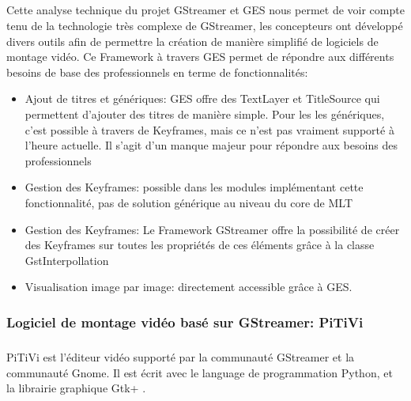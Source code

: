 \subparagraph{ }

Cette analyse technique du projet GStreamer et GES nous permet de voir
compte tenu de la technologie très complexe de GStreamer, les concepteurs
ont développé divers outils afin de permettre la création de manière
simplifié de logiciels de montage vidéo. Ce Framework à travers GES
permet de répondre aux différents besoins de base des professionnels
en terme de fonctionnalités:

\begin{itemize}

  \item {Ajout de titres et génériques: GES offre des TextLayer
  et TitleSource qui permettent d'ajouter des titres de manière
  simple. Pour les
    les génériques, c'est possible à travers de Keyframes, mais ce
    n'est pas vraiment supporté à l'heure actuelle. Il s'agit d'un
    manque majeur pour répondre aux besoins des professionnels}

  \item {Gestion des Keyframes: possible dans les modules implémentant
    cette fonctionnalité, pas de solution générique au niveau du core
    de MLT}

  \item {Gestion des Keyframes: Le Framework GStreamer offre la
  possibilité
    de créer des Keyframes sur toutes les propriétés de ces éléments
    grâce à la classe GstInterpollation}

  \item {Visualisation image par image: directement accessible grâce
  à GES.}

\end{itemize}

\subsubsection {Logiciel de montage vidéo basé sur GStreamer: PiTiVi}

\subparagraph{}

PiTiVi est l'éditeur vidéo supporté par la communauté GStreamer et la
communauté Gnome. Il est écrit avec le language de programmation Python,
et la librairie graphique Gtk+ .

